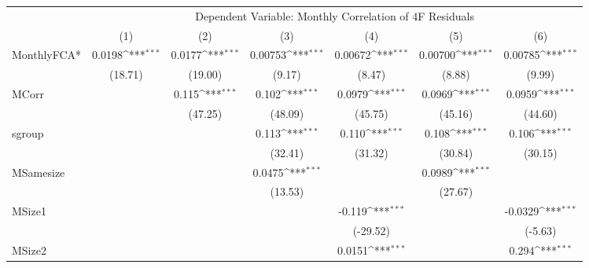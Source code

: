 {
\def\sym#1{\ifmmode^{#1}\else\(^{#1}\)\fi}
\begin{tabular}{l*{6}{c}}
\hline\hline
 & \multicolumn{6}{c}{Dependent Variable: Monthly Correlation of 4F Residuals}                 \\
 \cline{2-7}
                    &\multicolumn{1}{c}{(1)}         &\multicolumn{1}{c}{(2)}         &\multicolumn{1}{c}{(3)}         &\multicolumn{1}{c}{(4)}         &\multicolumn{1}{c}{(5)}         &\multicolumn{1}{c}{(6)}         \\
\hline
MonthlyFCA*         &      0.0198\sym{***}&      0.0177\sym{***}&     0.00753\sym{***}&     0.00672\sym{***}&     0.00700\sym{***}&     0.00785\sym{***}\\
                    &     (18.71)         &     (19.00)         &      (9.17)         &      (8.47)         &      (8.88)         &      (9.99)         \\
[1em]
MCorr               &                     &       0.115\sym{***}&       0.102\sym{***}&      0.0979\sym{***}&      0.0969\sym{***}&      0.0959\sym{***}\\
                    &                     &     (47.25)         &     (48.09)         &     (45.75)         &     (45.16)         &     (44.60)         \\
[1em]
sgroup              &                     &                     &       0.113\sym{***}&       0.110\sym{***}&       0.108\sym{***}&       0.106\sym{***}\\
                    &                     &                     &     (32.41)         &     (31.32)         &     (30.84)         &     (30.15)         \\
[1em]
MSamesize           &                     &                     &      0.0475\sym{***}&                     &      0.0989\sym{***}&                     \\
                    &                     &                     &     (13.53)         &                     &     (27.67)         &                     \\
[1em]
MSize1              &                     &                     &                     &      -0.119\sym{***}&                     &     -0.0329\sym{***}\\
                    &                     &                     &                     &    (-29.52)         &                     &     (-5.63)         \\
[1em]
MSize2              &                     &                     &                     &      0.0151\sym{***}&                     &       0.294\sym{***}\\

\end{tabular}}
